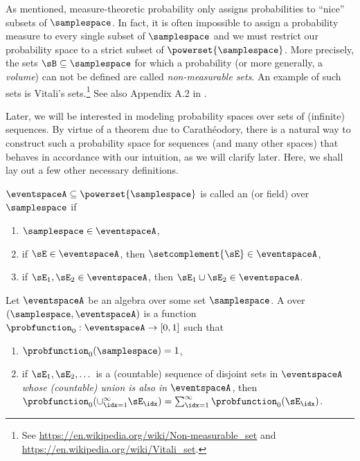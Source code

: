 As mentioned, measure-theoretic probability only assigns probabilities to ``nice'' subsets of $\samplespace$.
In fact, it is often impossible to assign a probability measure to every single subset of $\samplespace$ and we must restrict our probability space to a strict subset of $\powerset{\samplespace}$.
More precisely, the sets $\sB \subseteq \samplespace$ for which a probability (or more generally, a \emph{volume}) can not be defined are called \emph{non-measurable sets}. 
An example of such sets is Vitali's sets.\footnote{See \url{https://en.wikipedia.org/wiki/Non-measurable_set} and \url{https://en.wikipedia.org/wiki/Vitali_set}.}
See also Appendix A.2 in \citet{Durrett2019}.

Later, we will be interested in modeling probability spaces over sets of (infinite) sequences.
By virtue of a theorem due to Carath\'{e}odory, there is a natural way to construct such a probability space for sequences (and many other spaces) that behaves in accordance with our intuition, as we will clarify later. 
Here, we shall lay out a few other necessary definitions.
\begin{definition}
$\eventspaceA \subseteq \powerset{\samplespace}$ is called an  (or field) over $\samplespace$ if
\begin{enumerate}[label=\arabic*)]
    \item $\samplespace\in\eventspaceA$,
    \item if $\sE\in\eventspaceA$, then $\setcomplement{\sE} \in \eventspaceA$,
    \item if $\sE_1,\sE_2 \in \eventspaceA$, then $\sE_1 \cup \sE_2 \in \eventspaceA$.
\end{enumerate}
\end{definition}

\begin{definition}
Let $\eventspaceA$ be an algebra over some set $\samplespace$. A  over $(\samplespace,\eventspaceA)$ is a function $\probfunction_0:\eventspaceA \to [0,1]$ such that
\begin{enumerate}[label=\arabic*)]
    \item $\probfunction_0(\samplespace)=1$,
    \item if $\sE_1,\sE_2,\dots$ is a (countable) sequence of disjoint sets in $\eventspaceA$ \emph{whose (countable) union is also in} $\eventspaceA$, then $\probfunction_0(\cup_{\idx=1}^\infty \sE_\idx)=\sum_{\idx=1}^{\infty} \probfunction_0(\sE_\idx)$.
\end{enumerate}
\end{definition}

